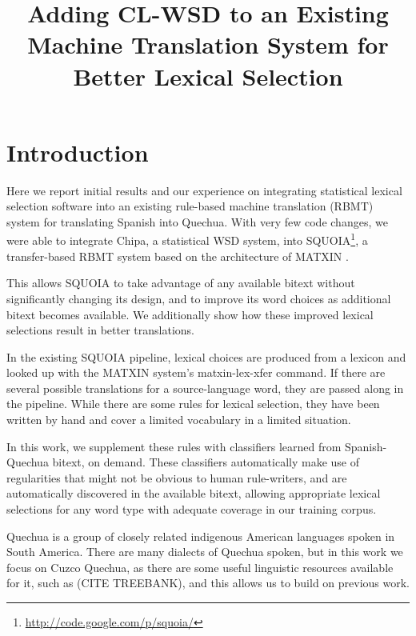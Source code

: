 \documentclass[10pt, a4paper]{article}
\title{Adding CL-WSD to an Existing Machine Translation System for Better Lexical Selection}
\begin{document}
\maketitleabstract

\section{Introduction}
Here we report initial results and our experience on integrating statistical
lexical selection software into an existing rule-based machine translation
(RBMT) system for translating Spanish into Quechua.
With very few code changes, we were able to integrate Chipa, a statistical WSD
system, into SQUOIA\footnote{\url{http://code.google.com/p/squoia/}},
a transfer-based RBMT system based on the architecture of MATXIN
\cite{matxin,matxin_2005}.

This allows SQUOIA to take advantage of any available bitext without
significantly changing its design, and to improve its word choices as
additional bitext becomes available. We additionally show how these improved
lexical selections result in better translations.

In the existing SQUOIA pipeline, lexical choices are produced from a lexicon
and looked up with the MATXIN system's matxin-lex-xfer command. If there are
several possible translations for a source-language word, they are passed along
in the pipeline. While there are some rules for lexical selection, they have
been written by hand and cover a limited vocabulary in a limited situation.

In this work, we supplement these rules with classifiers learned from
Spanish-Quechua bitext, on demand. These classifiers automatically make use of
regularities that might not be obvious to human rule-writers, and are
automatically discovered in the available bitext, allowing appropriate lexical
selections for any word type with adequate coverage in our training corpus.

Quechua is a group of closely related indigenous American languages spoken in
South America. There are many dialects of Quechua spoken, but in this work we
focus on Cuzco Quechua, as there are some useful linguistic resources available
for it, such as (CITE TREEBANK), and this allows us to build on previous work.
\end{document}
